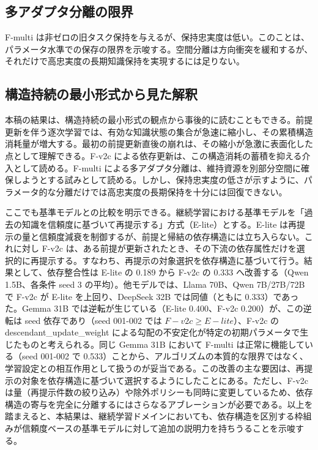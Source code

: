 \documentclass[12pt,a4paper]{article}
\begin{document}
\subsection{多アダプタ分離の限界}\label{ux591aux30a2ux30c0ux30d7ux30bfux5206ux96e2ux306eux9650ux754c}

F-multi は非ゼロの旧タスク保持を与えるが、保持忠実度は低い。このことは、パラメータ水準での保存の限界を示唆する。空間分離は方向衝突を緩和するが、それだけで高忠実度の長期知識保持を実現するには足りない。

\subsection{構造持続の最小形式から見た解釈}\label{ux69cbux9020ux6301ux7d9aux306eux6700ux5c0fux5f62ux5f0fux304bux3089ux898bux305fux89e3ux91c8}

本稿の結果は、構造持続の最小形式の観点から事後的に読むこともできる。前提更新を伴う逐次学習では、有効な知識状態の集合が急速に縮小し、その累積構造消耗量が増大する。最初の前提更新直後の崩れは、その縮小が急激に表面化した点として理解できる。F-v2c による依存更新は、この構造消耗の蓄積を抑える介入として読める。F-multi による多アダプタ分離は、維持資源を別部分空間に確保しようとする試みとして読める。しかし、保持忠実度の低さが示すように、パラメータ的な分離だけでは高忠実度の長期保持を十分には回復できない。

ここでも基準モデルとの比較を明示できる。継続学習における基準モデルを「過去の知識を信頼度に基づいて再提示する」方式（E-lite）とする。E-lite は再提示の量と信頼度減衰を制御するが、前提と帰結の依存構造には立ち入らない。これに対し F-v2c は、ある前提が更新されたとき、その下流の依存属性だけを選択的に再提示する。すなわち、再提示の対象選択を依存構造に基づいて行う。結果として、依存整合性は E-lite の 0.189 から F-v2c の 0.333 へ改善する（Qwen 1.5B、各条件 seed 3 の平均）。他モデルでは、Llama 70B、Qwen 7B/27B/72B で F-v2c が E-lite を上回り、DeepSeek 32B では同値（ともに 0.333）であった。Gemma 31B では逆転が生じている（E-lite 0.400、F-v2c 0.200）が、この逆転は seed 依存であり（seed 001-002 では \(F-v2c \ge E-lite\)）、F-v2c の descendant\_update\_weight による勾配の不安定化が特定の初期パラメータで生じたものと考えられる。同じ Gemma 31B において F-multi は正常に機能している（seed 001-002 で 0.533）ことから、アルゴリズムの本質的な限界ではなく、学習設定との相互作用として扱うのが妥当である。この改善の主な要因は、再提示の対象を依存構造に基づいて選択するようにしたことにある。ただし、F-v2c は量（再提示件数の絞り込み）や除外ポリシーも同時に変更しているため、依存構造の寄与を完全に分離するにはさらなるアブレーションが必要である。以上を踏まえると、本結果は、継続学習ドメインにおいても、依存構造を区別する枠組みが信頼度ベースの基準モデルに対して追加の説明力を持ちうることを示唆する。
\end{document}
